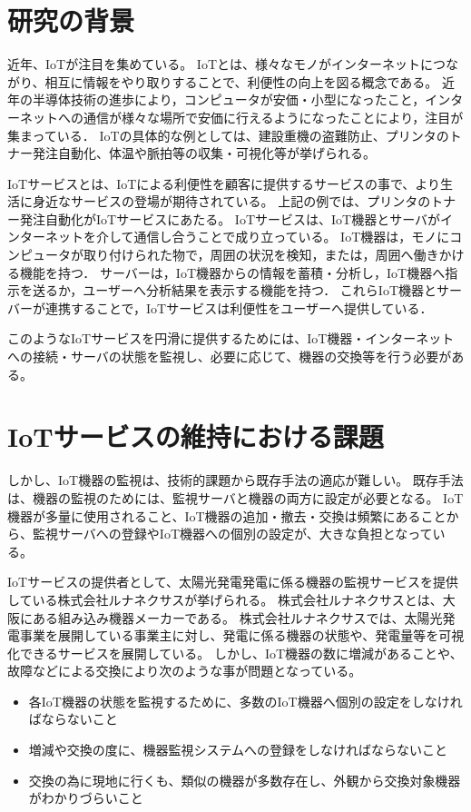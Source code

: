 \section{研究の背景}
近年、IoTが注目を集めている。
IoTとは、様々なモノがインターネットにつながり、相互に情報をやり取りすることで、利便性の向上を図る概念である。
近年の半導体技術の進歩により，コンピュータが安価・小型になったこと，インターネットへの通信が様々な場所で安価に行えるようになったことにより，注目が集まっている．
IoTの具体的な例としては、建設重機の盗難防止、プリンタのトナー発注自動化、体温や脈拍等の収集・可視化等が挙げられる。
\medskip

IoTサービスとは、IoTによる利便性を顧客に提供するサービスの事で、より生活に身近なサービスの登場が期待されている。
上記の例では、プリンタのトナー発注自動化がIoTサービスにあたる。
IoTサービスは、IoT機器とサーバがインターネットを介して通信し合うことで成り立っている。
IoT機器は，モノにコンピュータが取り付けられた物で，周囲の状況を検知，または，周囲へ働きかける機能を持つ．
サーバーは，IoT機器からの情報を蓄積・分析し，IoT機器へ指示を送るか，ユーザーへ分析結果を表示する機能を持つ．
これらIoT機器とサーバーが連携することで，IoTサービスは利便性をユーザーへ提供している．
\medskip

このようなIoTサービスを円滑に提供するためには、IoT機器・インターネットへの接続・サーバの状態を監視し、必要に応じて、機器の交換等を行う必要がある。


\section{IoTサービスの維持における課題}
しかし、IoT機器の監視は、技術的課題から既存手法の適応が難しい。
既存手法は、機器の監視のためには、監視サーバと機器の両方に設定が必要となる。
IoT機器が多量に使用されること、IoT機器の追加・撤去・交換は頻繁にあることから、監視サーバへの登録やIoT機器への個別の設定が、大きな負担となっている。


IoTサービスの提供者として、太陽光発電発電に係る機器の監視サービスを提供している株式会社ルナネクサスが挙げられる。
株式会社ルナネクサスとは、大阪にある組み込み機器メーカーである。
株式会社ルナネクサスでは、太陽光発電事業を展開している事業主に対し、発電に係る機器の状態や、発電量等を可視化できるサービスを展開している。
しかし、IoT機器の数に増減があることや、故障などによる交換により次のような事が問題となっている。
\begin{itemize}
\item 各IoT機器の状態を監視するために、多数のIoT機器へ個別の設定をしなければならないこと
\item 増減や交換の度に、機器監視システムへの登録をしなければならないこと
\item 交換の為に現地に行くも、類似の機器が多数存在し、外観から交換対象機器がわかりづらいこと

\end{itemize}


